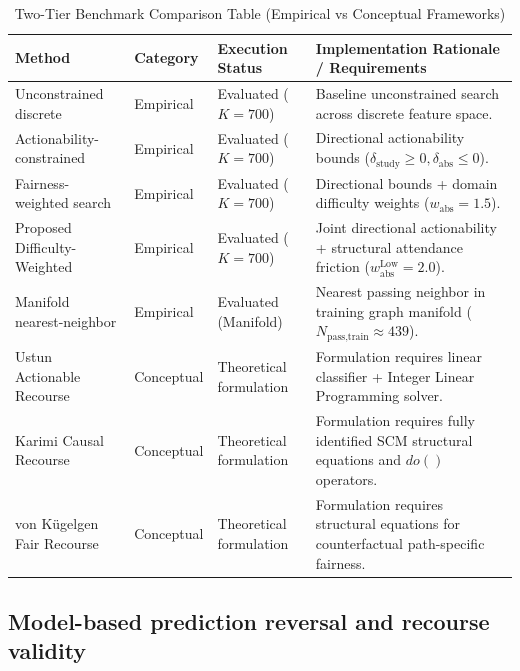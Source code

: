 \documentclass[11pt]{article}
\begin{document}
\begin{table}[H]
\centering
\caption{Two-Tier Benchmark Comparison Table (Empirical vs Conceptual Frameworks)}
\label{tab:two_tier_benchmark}
\small
\begin{tabularx}{\textwidth}{>{\raggedright\arraybackslash}p{3.2cm} >{\raggedright\arraybackslash}p{2.0cm} >{\raggedright\arraybackslash}p{2.5cm} >{\raggedright\arraybackslash}X}
\toprule
\textbf{Method} & \textbf{Category} & \textbf{Execution Status} & \textbf{Implementation Rationale / Requirements} \\
\midrule
Unconstrained discrete & Empirical & Evaluated ($K=700$) & Baseline unconstrained search across discrete feature space. \\
Actionability-constrained & Empirical & Evaluated ($K=700$) & Directional actionability bounds ($\delta_{\text{study}} \ge 0, \delta_{\text{abs}} \le 0$). \\
Fairness-weighted search & Empirical & Evaluated ($K=700$) & Directional bounds + domain difficulty weights ($w_{\text{abs}}=1.5$). \\
Proposed Difficulty-Weighted & Empirical & Evaluated ($K=700$) & Joint directional actionability + structural attendance friction ($w_{\text{abs}}^{\text{Low}}=2.0$). \\
Manifold nearest-neighbor & Empirical & Evaluated (Manifold) & Nearest passing neighbor in training graph manifold ($N_{\text{pass,train}} \approx 439$). \\
\midrule
Ustun Actionable Recourse \cite{Ustun2019} & Conceptual & Theoretical formulation & Formulation requires linear classifier + Integer Linear Programming solver. \\
Karimi Causal Recourse \cite{Karimi2021} & Conceptual & Theoretical formulation & Formulation requires fully identified SCM structural equations and $do()$ operators. \\
von K\"ugelgen Fair Recourse \cite{vonKugelgen2022} & Conceptual & Theoretical formulation & Formulation requires structural equations for counterfactual path-specific fairness. \\
\bottomrule
\end{tabularx}
\end{table}

\subsection{Model-based prediction reversal and recourse validity}
\label{subsec:prediction_reversal}
\end{document}
